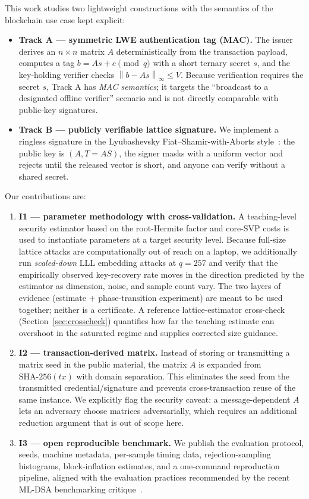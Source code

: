 \documentclass[11pt]{article}
\newcommand{\norminf}[1]{\left\lVert #1 \right\rVert_\infty}
\begin{document}
This work studies two lightweight constructions with the semantics of the
blockchain use case kept explicit:

\begin{itemize}
\item \textbf{Track A --- symmetric LWE authentication tag (MAC).} The issuer
  derives an $n\times n$ matrix $A$ deterministically from the transaction
  payload, computes a tag $b = A s + e \pmod q$ with a short ternary secret $s$,
  and the key-holding verifier checks $\norminf{b - A s} \le V$.  Because
  verification requires the secret $s$, Track A has \emph{MAC semantics}; it
  targets the ``broadcast to a designated offline verifier'' scenario and is
  not directly comparable with public-key signatures.
\item \textbf{Track B --- publicly verifiable lattice signature.} We implement
  a ringless signature in the Lyubashevsky
  Fiat--Shamir-with-Aborts style~\cite{lyubashevsky2009fsa,lyubashevsky2012lswt}:
  the public key is $(A, T = A S)$, the signer masks with a uniform vector and
  rejects until the released vector is short, and anyone can verify without a
  shared secret.
\end{itemize}

Our contributions are:

\begin{enumerate}
\item \textbf{I1 --- parameter methodology with cross-validation.} A
  teaching-level security estimator based on the root-Hermite factor and
  core-SVP costs is used to instantiate parameters at a target security level.
  Because full-size lattice attacks are computationally out of reach on a
  laptop, we additionally run \emph{scaled-down} LLL embedding attacks at
  $q=257$ and verify that the empirically observed key-recovery rate moves in
  the direction predicted by the estimator as dimension, noise, and sample
  count vary.  The two layers of evidence (estimate + phase-transition
  experiment) are meant to be used together; neither is a certificate.  A
  reference lattice-estimator cross-check (Section~\ref{sec:crosscheck})
  quantifies how far the teaching estimate can overshoot in the saturated
  regime and supplies corrected size guidance.
\item \textbf{I2 --- transaction-derived matrix.}  Instead of storing or
  transmitting a matrix seed in the public material, the matrix $A$ is
  expanded from $\mathrm{SHA\text{-}256}(tx)$ with domain separation.  This
  eliminates the seed from the transmitted credential/signature and prevents
  cross-transaction reuse of the same instance.  We explicitly flag the
  security caveat: a message-dependent $A$ lets an adversary choose matrices
  adversarially, which requires an additional reduction argument that is out of
  scope here.
\item \textbf{I3 --- open reproducible benchmark.}  We publish the evaluation
  protocol, seeds, machine metadata, per-sample timing data, rejection-sampling
  histograms, block-inflation estimates, and a one-command reproduction
  pipeline, aligned with the evaluation practices recommended by the recent
  ML-DSA benchmarking critique~\cite{mldsa-bench-2026}.
\end{enumerate}
\end{document}
